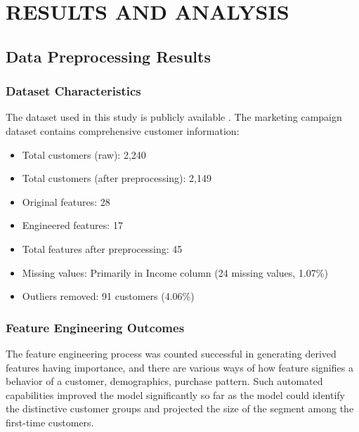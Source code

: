 \documentclass[12pt,a4paper]{report}
\begin{document}
\chapter{RESULTS AND ANALYSIS}

\section{Data Preprocessing Results}

\subsection{Dataset Characteristics}
\noindent The dataset used in this study is publicly available \cite{datasetlink}.
\noindent The marketing campaign dataset contains comprehensive customer information:
\begin{itemize}
    \item Total customers (raw): 2,240
    \item Total customers (after preprocessing): 2,149
    \item Original features: 28
    \item Engineered features: 17
    \item Total features after preprocessing: 45
    \item Missing values: Primarily in Income column (24 missing values, 1.07\%)
    \item Outliers removed: 91 customers (4.06\%)
\end{itemize}

\subsection{Feature Engineering Outcomes}
\noindent The feature engineering process was counted successful in generating derived features having importance, and there are various ways of how feature signifies a behavior of a customer, demographics, purchase pattern. Such automated capabilities improved the model significantly so far as the model could identify the distinctive customer groups and projected the size of the segment among the first-time customers.
\end{document}
